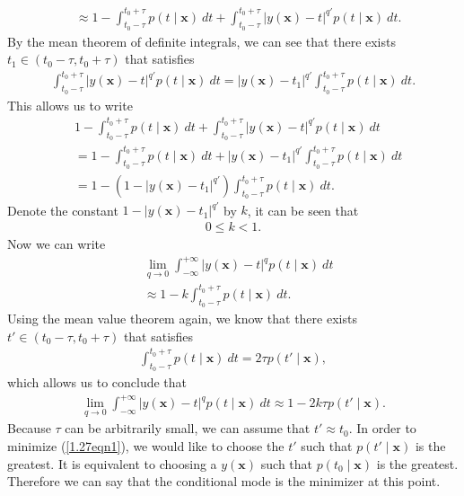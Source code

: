 \begin{answer}{}
\begin{align}
		&\approx 1 - \int_{t_0 - \tau}^{t_0 + \tau} p(t \mid \bm{x})\ dt + \int_{t_0 - \tau}^{t_0 + \tau} \lvert y(\bm{x}) - t \rvert^{q'} p(t \mid \bm{x})\ dt.
	\end{align}
	By the mean theorem of definite integrals, we can see that there exists $t_1 \in (t_0 - \tau, t_0 + \tau)$ that satisfies
	\begin{align}
		\int_{t_0 - \tau}^{t_0 + \tau} \lvert y(\bm{x}) - t \rvert^{q'} p(t \mid \bm{x})\ dt = \lvert y(\bm{x}) - t_1 \rvert^{q'} \int_{t_0 - \tau}^{t_0 + \tau} p(t \mid \bm{x})\ dt.
	\end{align}
	This allows us to write
	\begin{align}
		&1 - \int_{t_0 - \tau}^{t_0 + \tau} p(t \mid \bm{x})\ dt + \int_{t_0 - \tau}^{t_0 + \tau} \lvert y(\bm{x}) - t \rvert^{q'} p(t \mid \bm{x})\ dt\\
		&= 1 - \int_{t_0 - \tau}^{t_0 + \tau} p(t \mid \bm{x})\ dt + \lvert y(\bm{x}) - t_1 \rvert^{q'} \int_{t_0 - \tau}^{t_0 + \tau} p(t \mid \bm{x})\ dt\\
		&= 1 - (1 - \lvert y(\bm{x}) - t_1 \rvert^{q'})\int_{t_0 - \tau}^{t_0 + \tau} p(t \mid \bm{x})\ dt.
	\end{align}
	Denote the constant $1 - \lvert y(\bm{x}) - t_1 \rvert^{q'}$ by $k$, it can be seen that
	\begin{align}
		0 \leq k < 1.
	\end{align}
	Now we can write
	\begin{align}
		&\lim_{q \rightarrow 0} \int_{-\infty}^{+\infty} \lvert y(\bm{x}) - t \rvert^q p(t \mid \bm{x})\ dt\\
		&\approx 1 - k\int_{t_0 - \tau}^{t_0 + \tau} p(t \mid \bm{x})\ dt. \label{1.27eqn2}
	\end{align}
	Using the mean value theorem again, we know that there exists $t' \in (t_0 - \tau, t_0 + \tau)$ that satisfies
	\begin{align}
		\int_{t_0 - \tau}^{t_0 + \tau} p(t \mid \bm{x})\ dt = 2\tau p(t' \mid \bm{x}),
	\end{align}
	which allows us to conclude that
	\begin{align}
		\lim_{q \rightarrow 0} \int_{-\infty}^{+\infty} \lvert y(\bm{x}) - t \rvert^q p(t \mid \bm{x})\ dt \approx 1 - 2k\tau p(t' \mid \bm{x}).
	\end{align}
	Because $\tau$ can be arbitrarily small, we can assume that $t' \approx t_0$. In order to minimize (\ref{1.27eqn1}), we would like to choose the $t'$ such that $p(t' \mid \bm{x})$ is the greatest. It is equivalent to choosing a $y(\bm{x})$ such that $p(t_0 \mid \bm{x})$ is the greatest. Therefore we can say that the conditional mode is the minimizer at this point.
\end{answer}